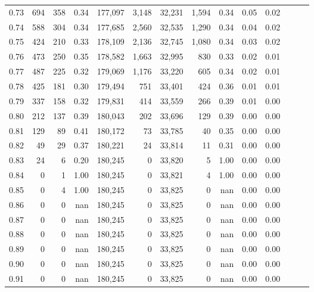 \begin{tabular}{rrrrrrrrrrrrrr}
0.73 &    694 &    358 &  0.34 &  177,097 &    3,148 &  32,231 &   1,594 &  0.34 &  0.05 &      0.02 \\
0.74 &    588 &    304 &  0.34 &  177,685 &    2,560 &  32,535 &   1,290 &  0.34 &  0.04 &      0.02 \\
0.75 &    424 &    210 &  0.33 &  178,109 &    2,136 &  32,745 &   1,080 &  0.34 &  0.03 &      0.02 \\
0.76 &    473 &    250 &  0.35 &  178,582 &    1,663 &  32,995 &     830 &  0.33 &  0.02 &      0.01 \\
0.77 &    487 &    225 &  0.32 &  179,069 &    1,176 &  33,220 &     605 &  0.34 &  0.02 &      0.01 \\
0.78 &    425 &    181 &  0.30 &  179,494 &      751 &  33,401 &     424 &  0.36 &  0.01 &      0.01 \\
0.79 &    337 &    158 &  0.32 &  179,831 &      414 &  33,559 &     266 &  0.39 &  0.01 &      0.00 \\
0.80 &    212 &    137 &  0.39 &  180,043 &      202 &  33,696 &     129 &  0.39 &  0.00 &      0.00 \\
0.81 &    129 &     89 &  0.41 &  180,172 &       73 &  33,785 &      40 &  0.35 &  0.00 &      0.00 \\
0.82 &     49 &     29 &  0.37 &  180,221 &       24 &  33,814 &      11 &  0.31 &  0.00 &      0.00 \\
0.83 &     24 &      6 &  0.20 &  180,245 &        0 &  33,820 &       5 &  1.00 &  0.00 &      0.00 \\
0.84 &      0 &      1 &  1.00 &  180,245 &        0 &  33,821 &       4 &  1.00 &  0.00 &      0.00 \\
0.85 &      0 &      4 &  1.00 &  180,245 &        0 &  33,825 &       0 &   nan &  0.00 &      0.00 \\
0.86 &      0 &      0 &   nan &  180,245 &        0 &  33,825 &       0 &   nan &  0.00 &      0.00 \\
0.87 &      0 &      0 &   nan &  180,245 &        0 &  33,825 &       0 &   nan &  0.00 &      0.00 \\
0.88 &      0 &      0 &   nan &  180,245 &        0 &  33,825 &       0 &   nan &  0.00 &      0.00 \\
0.89 &      0 &      0 &   nan &  180,245 &        0 &  33,825 &       0 &   nan &  0.00 &      0.00 \\
0.90 &      0 &      0 &   nan &  180,245 &        0 &  33,825 &       0 &   nan &  0.00 &      0.00 \\
0.91 &      0 &      0 &   nan &  180,245 &        0 &  33,825 &       0 &   nan &  0.00 &      0.00 \\

\end{tabular}
